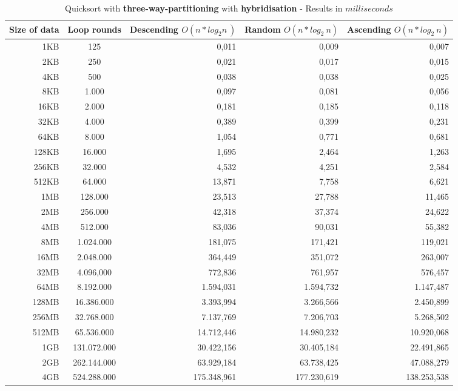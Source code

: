 \documentclass[11pt]{amsart}
\begin{document}
\begin{table}[htdp]
	\caption{Quicksort with \textbf{three-way-partitioning} with \textbf{hybridisation} - Results in $milliseconds$}
	\begin{tabular}{|r|c|r|r|r|} \hline
		Size of data & Loop rounds & \parbox[c]{3.5cm}{Descending \\ $O(n*log_2n~)$} & \parbox[c]{3.5cm}{Random \\$O(n*log_2~n)$} & \parbox[c]{3.5cm}{Ascending \\ $O(n*log_2~n)$} \\ \hline
		1KB & 125 & 0,011 & 0,009 & 0,007 \\ \hline
		2KB & 250 & 0,021 & 0,017 & 0,015 \\ \hline
		4KB & 500 & 0,038 & 0,038 & 0,025 \\ \hline
		8KB & 1.000 & 0,097 & 0,081 & 0,056 \\ \hline
		16KB & 2.000 & 0,181 & 0,185 & 0,118 \\ \hline
		32KB & 4.000 & 0,389 & 0,399 & 0,231 \\ \hline
		64KB & 8.000 & 1,054 & 0,771 & 0,681 \\ \hline
		128KB & 16.000 & 1,695 & 2,464 & 1,263 \\ \hline
		256KB & 32.000 & 4,532 & 4,251 & 2,584 \\ \hline
		512KB & 64.000 & 13,871 & 7,758 & 6,621 \\ \hline
		1MB & 128.000 & 23,513 & 27,788 & 11,465 \\ \hline
		2MB & 256.000 & 42,318 & 37,374 & 24,622 \\ \hline
		4MB & 512.000 & 83,036 & 90,031 & 55,382 \\ \hline
		8MB & 1.024.000 & 181,075 & 171,421 & 119,021 \\ \hline
		16MB & 2.048.000 & 364,449 & 351,072 & 263,007 \\ \hline
		32MB & 4.096,000 & 772,836 & 761,957 & 576,457 \\ \hline
		64MB & 8.192.000 & 1.594,031 & 1.594,732 & 1.147,487 \\ \hline
		128MB & 16.386.000 & 3.393,994 & 3.266,566 & 2.450,899 \\ \hline
		256MB & 32.768.000 & 7.137,769 & 7.206,703 & 5.268,502 \\ \hline
		512MB & 65.536.000 & 14.712,446 & 14.980,232 & 10.920,068 \\ \hline
		1GB & 131.072.000 & 30.422,156 & 30.405,184 & 22.491,865 \\ \hline
		2GB & 262.144.000 & 63.929,184 & 63.738,425 & 47.088,279 \\ \hline
		4GB & 524.288.000 & 175.348,961 & 177.230,619 & 138.253,538 \\ \hline
	\end{tabular}
	\label{default}
\end{table}%
\end{document}
